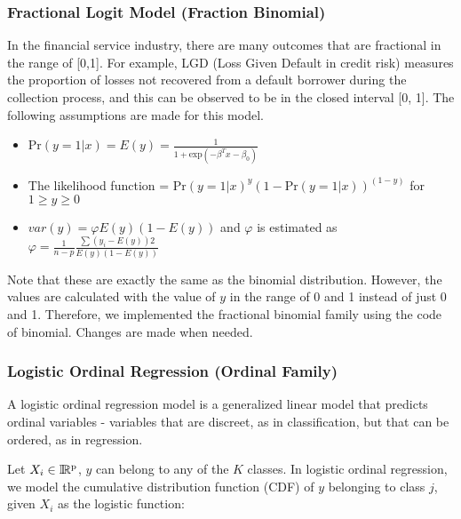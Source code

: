 \subsubsection{Fractional Logit Model (Fraction Binomial)}

In the financial service industry, there are many outcomes that are fractional in the range of [0,1]. For example, LGD (Loss Given Default in credit risk) measures the proportion of losses not recovered from a default borrower during the collection process, and this can be observed to be in the closed interval [0, 1]. The following assumptions are made for this model.

\begin{itemize}
\item $\text{Pr}(y=1|x) = E(y) = \frac{1}{1 + \text{exp}(-\beta^T x-\beta_0)}$
\item The likelihood function = $\text{Pr}{(y=1|x)}^y (1-\text{Pr}(y=1|x))^{(1-y)}$ for $1 \geq y \geq 0$
\item $var(y) = \varphi E(y)(1-E(y))$ and $\varphi$ is estimated as $\varphi = \frac{1}{n-p} \frac{\sum {(y_i - E(y))}2} {E(y)(1-E(y))}$
\end{itemize}

Note that these are exactly the same as the binomial distribution.  However, the values are  calculated with the value of $y$ in the range of 0 and 1 instead of just 0 and 1.  Therefore, we implemented the fractional binomial family using the code of binomial.  Changes are made when needed.

\waterExampleInR


\waterExampleInPython


\subsubsection{Logistic Ordinal Regression (Ordinal Family)}

A logistic ordinal regression model is a generalized linear model that predicts ordinal variables - variables that are discreet, as in classification, but that can be ordered, as in regression.

Let $X_i\in\rm \Bbb I \!\Bbb R^{p}$, $y$ can belong to any of the $K$ classes. In logistic ordinal regression, we model the cumulative distribution function (CDF) of $y$ belonging to class $j$, given $X_i$ as the logistic function:

